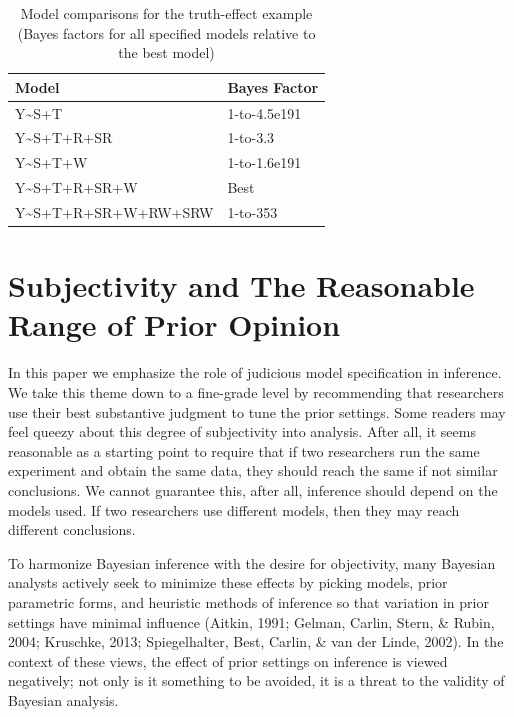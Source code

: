 \documentclass[
  english,
  ,man]{apa6}
\begin{document}
\begin{table}[tbp]

\begin{center}
\begin{threeparttable}

\caption{\label{tab:tableExample}Model comparisons for the truth-effect example (Bayes factors for all specified models relative to the best model)}

\begin{tabular}{ll}
\toprule
Model & \multicolumn{1}{c}{Bayes Factor}\\
\midrule
Y\textasciitilde{}S+T & 1-to-4.5e191\\
Y\textasciitilde{}S+T+R+SR & 1-to-3.3\\
Y\textasciitilde{}S+T+W & 1-to-1.6e191\\
Y\textasciitilde{}S+T+R+SR+W & Best\\
Y\textasciitilde{}S+T+R+SR+W+RW+SRW & 1-to-353\\
\bottomrule
\end{tabular}

\end{threeparttable}
\end{center}

\end{table}

\hypertarget{subjectivity-and-the-reasonable-range-of-prior-opinion}{%
\section{Subjectivity and The Reasonable Range of Prior Opinion}\label{subjectivity-and-the-reasonable-range-of-prior-opinion}}

In this paper we emphasize the role of judicious model specification in inference. We take this theme down to a fine-grade level by recommending that researchers use their best substantive judgment to tune the prior settings. Some readers may feel queezy about this degree of subjectivity into analysis. After all, it seems reasonable as a starting point to require that if two researchers run the same experiment and obtain the same data, they should reach the same if not similar conclusions. We cannot guarantee this, after all, inference should depend on the models used. If two researchers use different models, then they may reach different conclusions.

To harmonize Bayesian inference with the desire for objectivity, many Bayesian analysts actively seek to minimize these effects by picking models, prior parametric forms, and heuristic methods of inference so that variation in prior settings have minimal influence (Aitkin, 1991; Gelman, Carlin, Stern, \& Rubin, 2004; Kruschke, 2013; Spiegelhalter, Best, Carlin, \& van der Linde, 2002). In the context of these views, the effect of prior settings on inference is viewed negatively; not only is it something to be avoided, it is a threat to the validity of Bayesian analysis.
\end{document}
